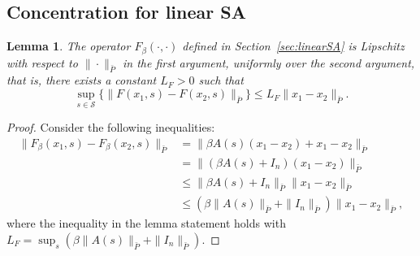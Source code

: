 \documentclass{article}
\newcommand{\lrp}[1]{\left( #1 \right)}
\newcommand{\calS}{{\mathcal S}}
\newtheorem{lemma}[theorem]{Lemma}
\begin{document}
\subsection{Concentration for linear SA}\label{app:linearSA}
\begin{lemma}\label{lem:verifyingassmp6linearsa}
    The operator $F_\beta(\cdot, \cdot)$ defined in Section~\ref{sec:linearSA} is Lipschitz with respect to $\|\cdot\|_{\bar{P}}$ in the first argument, uniformly over the second argument, that is,  there exists a constant $L_F > 0$ such that
    \[ \sup\limits_{s\in\calS} \big\{ \|F(x_1, s) - F(x_2, s)\|_{\bar{P}} \big\} \le L_F\|x_1 - x_2\|_{\bar{P}}. \]
\end{lemma}
\begin{proof}Consider the following inequalities:
    \begin{align*}
        \|F_\beta(x_1,s) - F_\beta(x_2, s)\|_{\bar{P}}
        &= \|\beta A(s)(x_1-x_2) + x_1 - x_2\|_{\bar{P}}\\
        &= \|(\beta A(s) + I_n) (x_1 - x_2)\|_{\bar{P}}\\
        &\le \|\beta A(s) + I_n\|_{\bar{P}} \|x_1 - x_2\|_{\bar{P}}\\
        &\le \lrp{\beta \|A(s)\|_{\bar{P}} + \|I_n\|_{\bar{P}}} \|x_1 - x_2\|_{\bar{P}},
    \end{align*}
    where the inequality  in the lemma statement holds with $L_F = \sup_s (\beta \|A(s)\|_{\bar{P}} + \|I_n\|_{\bar{P}})$.
\end{proof}
\end{document}
